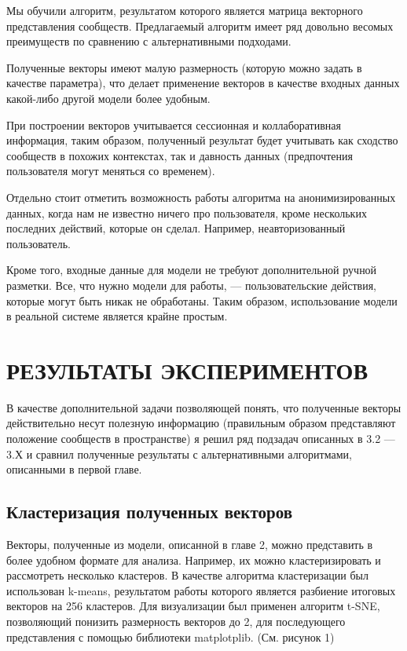 \documentclass[times,specification,annotation]{itmo-student-thesis}
\begin{document}
\chapterconclusion

Мы обучили алгоритм, результатом которого является матрица векторного
представления сообществ. Предлагаемый алгоритм имеет ряд довольно весомых
преимуществ по сравнению с альтернативными подходами. 

Полученные векторы
имеют малую размерность (которую можно задать в качестве параметра), что
делает применение векторов в качестве входных данных какой-либо другой
модели более удобным. 

При построении векторов учитывается сессионная и
коллаборативная информация, таким образом, полученный результат будет
учитывать как сходство сообществ в похожих контекстах, так и давность данных
(предпочтения пользователя могут меняться со временем). 

Отдельно стоит отметить возможность работы алгоритма на анонимизированных данных, когда
нам не известно ничего про пользователя, кроме нескольких последних действий,
которые он сделал. Например, неавторизованный пользователь.

Кроме того, входные данные для модели не требуют дополнительной ручной разметки. Все, что нужно модели для работы, --- пользовательские действия, которые могут быть никак не обработаны. Таким образом, использование модели в реальной системе является крайне простым.

\chapter{РЕЗУЛЬТАТЫ ЭКСПЕРИМЕНТОВ}

В качестве дополнительной задачи позволяющей понять, что полученные
векторы действительно несут полезную информацию (правильным образом
представляют положение сообществ в пространстве) я решил ряд подзадач
описанных в 3.2 --- 3.Х и сравнил полученные результаты с альтернативными
алгоритмами, описанными в первой главе.

\section{Кластеризация полученных векторов}

Векторы, полученные из модели, описанной в главе 2, можно представить в
более удобном формате для анализа. Например, их можно кластеризировать и
рассмотреть несколько кластеров. В качестве алгоритма кластеризации был
использован k-means, результатом работы которого является разбиение итоговых
векторов на 256 кластеров. Для визуализации был применен алгоритм t-SNE,
позволяющий понизить размерность векторов до 2, для последующего
представления с помощью библиотеки matplotplib. (См. рисунок 1)
\end{document}
